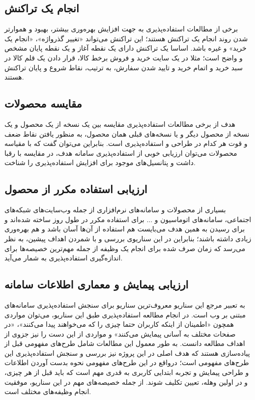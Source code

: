\subsection{انجام یک تراکنش}
برخی از مطالعات استفاده‌پذیری به جهت افزایش بهره‌وری بیشتر، بهبود و هموارتر شدن روند انجام یک تراکنش هستند؛ این تراکنش می‌تواند «تغییر گذرواژه»، «انجام یک خرید» و غیره باشد. اساسا یک تراکنش دارای یک نقطه آغاز و یک نقطه پایان مشخص و واضح است؛ مثلا در یک سایت خرید و فروش برخط کالا، قرار دادن یک قلم کالا در سبد خرید و اتمام خرید و تایید شدن سفارش، به ترتیب، نقاط شروع و پایان تراکنش هستند.
\subsection{مقایسه محصولات}
هدف از برخی مطالعات استفاده‌پذیری مقایسه بین یک نسخه از یک محصول و یک نسخه از محصول دیگر و یا نسخه‌های قبلی همان محصول، به منظور یافتن نقاط ضعف و قوت هر کدام در طراحی و استفاده‌پذیری است. بنابراین می‌توان گفت که با مقیاسه محصولات می‌توان ارزیابی خوبی از استفاده‌پذیری سامانه هدف، در مقایسه با رقبا داشت و پتانسیل‌های موجود برای افزایش استفاده‌پذیری را شناخت.
\subsection{ارزیابی استفاده مکرر از محصول}
بسیاری از محصولات و سامانه‌های نرم‌افزاری از جمله وب‌سایت‌های شبکه‌های اجتماعی، سامانه‌های اتوماسیون و ... برای استفاده مکرر در طول روز ساخته شده‌اند و برای رسیدن به همین هدف می‌بایست هم استفاده از آن‌ها آسان باشد و هم بهره‌وری زیادی داشته باشند؛ بنابراین در این سناریوی بررسی و با شمردن اهداف پیشین، به نظر می‌رسد که زمان صرف شده برای انجام یک وظیفه از جمله مهم‌ترین خصیصه‌ها برای اندازه‌گیری استفاده‌پذیری به شمار می‌آید.
\subsection{ارزیابی پیمایش و معماری اطلاعات سامانه}
به تعبیر مرجع
\cite{albert_measuring_2013}
این سناریو معروف‌ترین سناریو برای سنجش استفاده‌پذیری سامانه‌های مبتنی بر وب است. در انجام مطالعه استفاده‌پذیری طبق این سناریو، می‌توان مواردی همچون «اطمینان از اینکه کاربران حتما چیزی را که می‌خواهند پیدا می‌کنند»، «در صفحات مختلف به آسانی پیمایش می‌کنند» و مواردی از این دست را نیز جزوی از اهداف مطالعه دانست. به طور معمول این مطالعات شامل طرح‌های مفهومی قبل از پیاده‌سازی هستند که هدف اصلی در این پروژه نیز بررسی و سنجش استفاده‌پذیری این طرح‌های مفهومی است؛ درواقع در این طرح‌های مفهومی نحوه بدست آوردن اطلاعات و طراحی پیمایش و تجربه ابتدایی کاربری به قدری مهم است که باید قبل از هر چیزی، و در اولین وهله، تعیین تکلیف شوند.
از جمله خصیصه‌های مهم در این سناریو، موفقیت انجام وظیفه‌های مختلف است.
